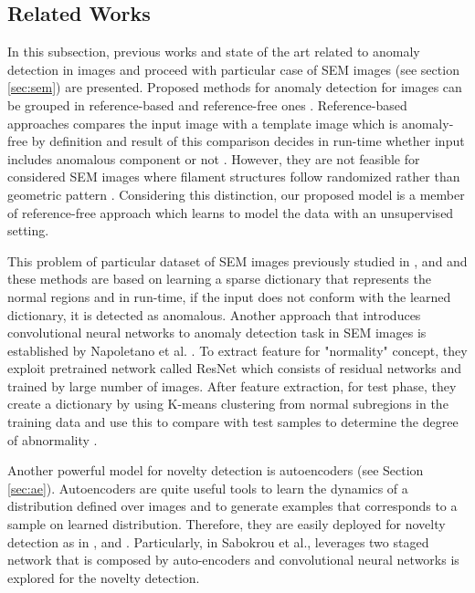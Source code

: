 {\subsection{Related Works}
\label{sec:relworks}

In this subsection, previous works and state of the art related to anomaly detection in images 
and proceed with particular case of SEM images (see section \ref{sec:sem}) are presented. Proposed 
methods for anomaly detection for images can be grouped in reference-based and reference-free ones 
\cite{Chandola:2009:ADS:1541880.1541882}. Reference-based approaches compares the input image with a 
template image which is anomaly-free by definition and result of this comparison decides in run-time 
whether input includes anomalous component or not \cite{zontak2010defect}.
However, they are not feasible for considered SEM images where filament structures follow
randomized rather than geometric pattern \cite{carrera2016defect}. Considering this distinction, our proposed model 
is a member of reference-free approach which learns to model the data with an unsupervised setting.

This problem of particular dataset of SEM images previously studied in \cite{carrera2016defect},
\cite{carrera-2016-scale} and \cite{boracchi2014novelty} and these methods are based on learning a 
sparse dictionary that represents the normal regions and in run-time, if the input does not conform 
with the learned dictionary, it is detected as anomalous. Another approach that introduces convolutional 
neural networks to anomaly detection task in SEM images is established by Napoletano et al. \cite{Napoletano2018anomaly}. 
To extract feature for "normality" concept, they exploit pretrained network called ResNet \cite{he2016deep} 
which consists of residual networks and trained by large number of images. After feature extraction, 
for test phase, they create a dictionary by using K-means clustering from normal subregions in the training data 
and use this to compare with test samples to determine the degree of abnormality \cite{Napoletano2018anomaly}.

Another powerful model for novelty detection is autoencoders (see Section \ref{sec:ae}). Autoencoders are quite useful 
tools to learn the dynamics of a distribution defined over images and to generate examples that corresponds 
to a sample on learned distribution. Therefore, they are easily deployed for novelty 
detection as in \cite{an2015variational}, \cite{leveau2017adversarial} and
\cite{Pidhorskyi:2018:GPN:3327757.3327787}. Particularly, in Sabokrou et al.\cite{sabokrou2018adversarially},
leverages two staged network that is composed by auto-encoders and convolutional neural networks is explored for
the novelty detection. 

}
